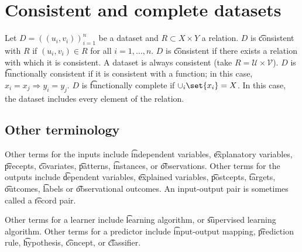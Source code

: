 \section*{Consistent and complete datasets}

Let $D = ((u_i, v_i))_{i = 1}^{n}$ be a dataset and $R \subset X \times  Y$ a relation.
$D$ is \t{consistent with} $R$ if $(u_i, v_i) \in R$ for all $i = 1, \dots , n$.
$D$ is \t{consistent} if there exists a relation with which it is consistent.
A dataset is always consistent (take $R = \mathcal{U}  \times \mathcal{V} $).
$D$ is \t{functionally consistent} if it is consistent with a function; in this case, $x_i = x_j \Rightarrow y_i = y_j$.
$D$ is \t{functionally complete} if $\cup_i\set{x_i} = X$.
In this case, the dataset includes every element of the relation.

\subsection*{Other terminology}

Other terms for the inputs include \t{independent variables}, \t{explanatory variables}, \t{precepts}, \t{covariates}, \t{patterns}, \t{instances}, or \t{observations}.
Other terms for the outputs include \t{dependent variables}, \t{explained variables}, \t{postcepts}, \t{targets}, \t{outcomes}, \t{labels} or \t{observational outcomes}.
An input-output pair is sometimes called a \t{record pair}.

Other terms for a learner include \t{learning algorithm}, or \t{supervised learning algorithm}.
Other terms for a predictor include \t{input-output mapping}, \t{prediction rule}, \t{hypothesis}, \t{concept}, or \t{classifier}.
